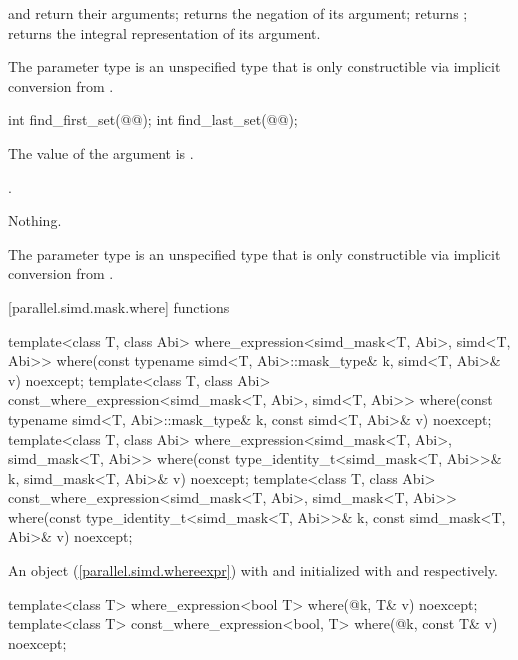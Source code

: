 \begin{itemdescr}
  \pnum\returns
   and  return their arguments;  returns the negation of its argument;  returns ;  returns the integral representation of its argument.

  \pnum\remarks
  The parameter type  is an unspecified type that is only constructible via implicit conversion from .
\end{itemdescr}

\begin{itemdecl}
int find_first_set(@@);
int find_last_set(@@);
\end{itemdecl}

\begin{itemdescr}
  \pnum\requires
  The value of the argument is .

  \pnum\returns
  .

  \pnum\throws Nothing.

  \pnum\remarks
  The parameter type  is an unspecified type that is only constructible via implicit conversion from .
\end{itemdescr}

[parallel.simd.mask.where]{ functions}

\begin{itemdecl}
template<class T, class Abi>
  where_expression<simd_mask<T, Abi>, simd<T, Abi>>
    where(const typename simd<T, Abi>::mask_type& k, simd<T, Abi>& v) noexcept;
template<class T, class Abi>
  const_where_expression<simd_mask<T, Abi>, simd<T, Abi>>
    where(const typename simd<T, Abi>::mask_type& k, const simd<T, Abi>& v) noexcept;
template<class T, class Abi>
  where_expression<simd_mask<T, Abi>, simd_mask<T, Abi>>
    where(const type_identity_t<simd_mask<T, Abi>>& k, simd_mask<T, Abi>& v) noexcept;
template<class T, class Abi>
  const_where_expression<simd_mask<T, Abi>, simd_mask<T, Abi>>
    where(const type_identity_t<simd_mask<T, Abi>>& k, const simd_mask<T, Abi>& v) noexcept;
\end{itemdecl}

\begin{itemdescr}
  \pnum\returns
  An object (\ref{parallel.simd.whereexpr}) with  and  initialized with  and  respectively.
\end{itemdescr}

\begin{itemdecl}
template<class T>
  where_expression<bool T>
    where(@\seebelow@ k, T& v) noexcept;
template<class T>
  const_where_expression<bool, T>
    where(@\seebelow@ k, const T& v) noexcept;
\end{itemdecl}

